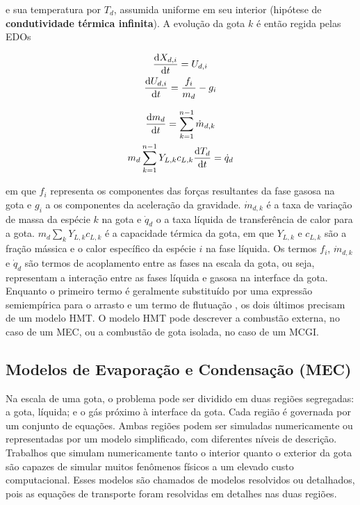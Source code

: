 e sua temperatura por $T_d$, assumida uniforme em seu interior (hipótese de \textbf{condutividade térmica infinita}).
A evolução da gota $k$ é então regida pelas EDOs \cite{JennyB2012}

\begin{minipage}{0.4\linewidth}
    \begin{gather}
        \frac{\mathrm{d} X_{d,i}}{\mathrm{d} t} = U_{d,i}
        \label{eq:Ud} \\
        \frac{\mathrm{d} U_{d,i}}{\mathrm{d} t} =
        \frac{f_i}{ m_{d}} -
        g_i 
        \label{eq:Xd}
    \end{gather}
\end{minipage}
\begin{minipage}{0.55\linewidth}
    \begin{gather}
        \frac{\mathrm{d} m_{d}}{\mathrm{d} t} = \sum_{k=1}^{n-1} \dot m_{d,k}
        \label{eq:md} \\
        m_d \sum_{k=1}^{n-1} Y_{L,k} c_{L,k} \frac{\mathrm{d} T_d}{\mathrm{d} t} = \dot q_d
        \label{eq:Td}
    \end{gather}
\end{minipage}

em que $f_i$ representa os componentes das forças resultantes da fase gasosa na gota e $g_i$ a os componentes da aceleração da gravidade.
$\dot m_{d,k}$ é a taxa de variação de massa da espécie $k$ na gota e $\dot q_d$ o a taxa líquida de transferência de calor para a gota.
$ m_d \sum_k Y_{L,k} c_{L,k}$ é a capacidade térmica da gota, em que 
$Y_{L,k}$ e $c_{L,k}$ são a fração mássica e o calor específico da  espécie $i$ na fase líquida.
Os termos $f_i$, $\dot m_{d,k}$ e $\dot q_d$ são termos de acoplamento entre as fases na escala da gota, ou seja, representam a interação entre as fases líquida e gasosa na interface da gota.
Enquanto o primeiro termo é geralmente substituído por uma expressão semiempírica para o arrasto e um termo de flutuação \cite[p. 16]{JennyB2012}, os dois últimos precisam de um modelo HMT.
O modelo HMT pode descrever a combustão externa, no caso de um MEC, ou a combustão de gota isolada, no caso de um MCGI.  



\subsection{Modelos de Evaporação e Condensação (MEC)} \label{sec:MEC}

Na escala de uma gota, o problema pode ser dividido em duas regiões segregadas: a gota, líquida; e o gás próximo à interface da gota. 
Cada região é governada por um conjunto de equações.
Ambas regiões podem ser simuladas numericamente ou representadas por um modelo simplificado, com diferentes níveis de descrição.
Trabalhos que simulam numericamente tanto o interior quanto o exterior da gota são capazes de simular muitos fenômenos físicos a um elevado custo computacional.
Esses modelos são chamados de modelos resolvidos ou detalhados, pois as equações de transporte foram resolvidas em detalhes nas duas regiões.

